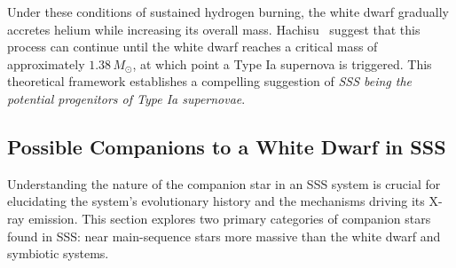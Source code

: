 			Under these conditions of sustained hydrogen burning, the white dwarf gradually accretes helium while increasing its overall mass. Hachisu \etal\ suggest that this process can continue until the white dwarf reaches a critical mass of approximately $1.38\,M_{\odot}$, at which point a Type Ia supernova is triggered. This theoretical framework establishes a compelling suggestion of \textit{SSS being the potential progenitors of Type Ia supernovae}.
		
		\subsection{Possible Companions to a White Dwarf in SSS} \label{introduction:current_status:wd-companions}
			Understanding the nature of the companion star in an SSS system is crucial for elucidating the system's evolutionary history and the mechanisms driving its X-ray emission. This section explores two primary categories of companion stars found in SSS: near main-sequence stars more massive than the white dwarf and symbiotic systems.
		
